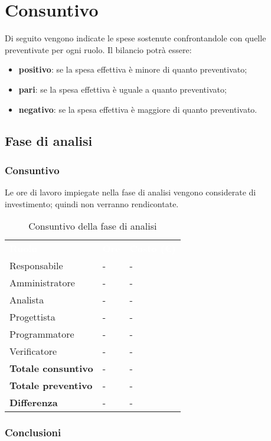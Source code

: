 \section{Consuntivo}
Di seguito vengono indicate le spese sostenute confrontandole con quelle preventivate per ogni ruolo.  Il bilancio potrà essere:
\begin{itemize}
\item \textbf{positivo}: se la spesa effettiva è minore di quanto preventivato;
\item \textbf{pari}: se la spesa effettiva è uguale a quanto preventivato;
\item \textbf{negativo}: se la spesa effettiva è maggiore di quanto preventivato.
\end{itemize}

\subsection{Fase di analisi}
\subsubsection{Consuntivo}
Le ore di lavoro impiegate nella fase di analisi vengono considerate di investimento; quindi non verranno rendicontate.

\begin{table}[!htbp]
\begin{center}
\renewcommand{\arraystretch}{1.5}
\begin{tabular}{ m{}<{\centering}  m{}<{\centering} m{}<{\centering}}
	\rowcolor{darkblue}
	\textcolor{white}{\textbf{Ruolo}}&\textcolor{white}{\textbf{Ore}}&\textcolor{white}{\textbf{Costo (\euro) }}\\ 

	Responsabile  & - & - \\	

	Amministratore & - & - \\
	
	Analista & - & - \\
	
	Progettista & - & - \\
	
	Programmatore & - & - \\
	
	Verificatore & - & - \\
	
	\textbf{Totale consuntivo } & - & - \\
	
	\textbf{Totale preventivo} & - & - \\
	
	\textbf{Differenza } & - & - \\
	
\end{tabular}
\caption{Consuntivo della fase di analisi}
\end{center}
\end{table}

\subsubsection{Conclusioni}